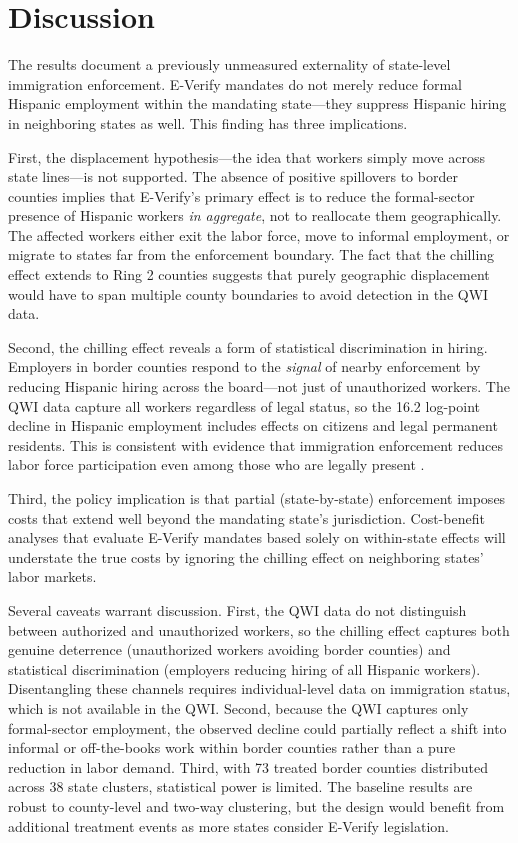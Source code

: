 \documentclass[12pt]{article}
\begin{document}
\section{Discussion}

The results document a previously unmeasured externality of state-level immigration enforcement. E-Verify mandates do not merely reduce formal Hispanic employment within the mandating state---they suppress Hispanic hiring in neighboring states as well. This finding has three implications.

First, the displacement hypothesis---the idea that workers simply move across state lines---is not supported. The absence of positive spillovers to border counties implies that E-Verify's primary effect is to reduce the formal-sector presence of Hispanic workers \textit{in aggregate}, not to reallocate them geographically. The affected workers either exit the labor force, move to informal employment, or migrate to states far from the enforcement boundary. The fact that the chilling effect extends to Ring 2 counties suggests that purely geographic displacement would have to span multiple county boundaries to avoid detection in the QWI data.

Second, the chilling effect reveals a form of statistical discrimination in hiring. Employers in border counties respond to the \textit{signal} of nearby enforcement by reducing Hispanic hiring across the board---not just of unauthorized workers. The QWI data capture all workers regardless of legal status, so the 16.2 log-point decline in Hispanic employment includes effects on citizens and legal permanent residents. This is consistent with evidence that immigration enforcement reduces labor force participation even among those who are legally present \citep{alsan2019, watson2014}.

Third, the policy implication is that partial (state-by-state) enforcement imposes costs that extend well beyond the mandating state's jurisdiction. Cost-benefit analyses that evaluate E-Verify mandates based solely on within-state effects will understate the true costs by ignoring the chilling effect on neighboring states' labor markets.

Several caveats warrant discussion. First, the QWI data do not distinguish between authorized and unauthorized workers, so the chilling effect captures both genuine deterrence (unauthorized workers avoiding border counties) and statistical discrimination (employers reducing hiring of all Hispanic workers). Disentangling these channels requires individual-level data on immigration status, which is not available in the QWI. Second, because the QWI captures only formal-sector employment, the observed decline could partially reflect a shift into informal or off-the-books work within border counties rather than a pure reduction in labor demand. Third, with 73 treated border counties distributed across 38 state clusters, statistical power is limited. The baseline results are robust to county-level and two-way clustering, but the design would benefit from additional treatment events as more states consider E-Verify legislation.
\end{document}

